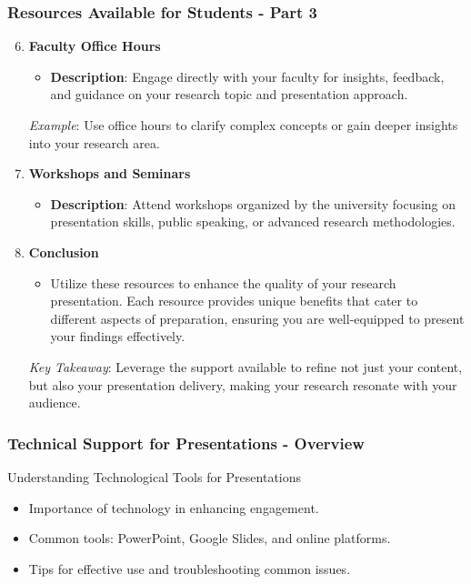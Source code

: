 \documentclass[aspectratio=169]{beamer}
\begin{document}
\begin{frame}[fragile]
    \frametitle{Resources Available for Students - Part 3}
    \begin{enumerate}
        \setcounter{enumi}{5} %
        \item \textbf{Faculty Office Hours}
        \begin{itemize}
            \item \textbf{Description}: Engage directly with your faculty for insights, feedback, and guidance on your research topic and presentation approach.
        \end{itemize}
        \pause
        \textit{Example}: Use office hours to clarify complex concepts or gain deeper insights into your research area.

        \item \textbf{Workshops and Seminars}
        \begin{itemize}
            \item \textbf{Description}: Attend workshops organized by the university focusing on presentation skills, public speaking, or advanced research methodologies.
        \end{itemize}
        
        \item \textbf{Conclusion}
        \begin{itemize}
            \item Utilize these resources to enhance the quality of your research presentation. Each resource provides unique benefits that cater to different aspects of preparation, ensuring you are well-equipped to present your findings effectively.
        \end{itemize}
        
        \pause
        \textit{Key Takeaway}: Leverage the support available to refine not just your content, but also your presentation delivery, making your research resonate with your audience.
    \end{enumerate}
\end{frame}

\begin{frame}[fragile]
    \frametitle{Technical Support for Presentations - Overview}
    \begin{block}{Understanding Technological Tools for Presentations}
        \begin{itemize}
            \item Importance of technology in enhancing engagement.
            \item Common tools: PowerPoint, Google Slides, and online platforms.
            \item Tips for effective use and troubleshooting common issues.
        \end{itemize}
    \end{block}
\end{frame}
\end{document}
